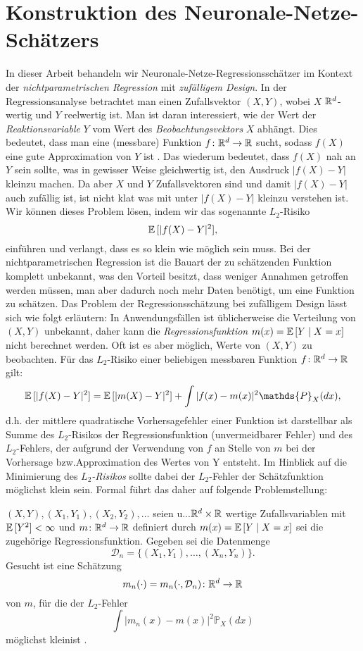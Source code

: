 \chapter{Konstruktion des Neuronale-Netze-Schätzers}
\label{chap:2}

In dieser Arbeit behandeln wir Neuronale-Netze-Regressionsschätzer im Kontext der \emph{nichtparametrischen Regression} mit \emph{zufälligem Design}. In der Regressionsanalyse betrachtet man einen Zufallsvektor $(X,Y)$, wobei $X$ $\mathbb{R}^d$-wertig und $Y$ reelwertig ist. Man ist daran interessiert, wie der Wert der \emph{Reaktionsvariable} $Y$ vom Wert des \emph{Beobachtungsvektors} $X$ abhängt. Dies bedeutet, dass man eine (messbare) Funktion $f\colon \mathbb{R}^d \to \mathbb{R}$ sucht, sodass $f(X)$ eine \glqq gute Approximation von $Y$ ist \grqq. Das wiederum bedeutet, dass $f(X)$ nah an $Y$ sein sollte, was in gewisser Weise gleichwertig ist, den Ausdruck $|f(X) - Y|$ \glqq klein\grqq zu machen. Da aber $X$ und $Y$ Zufallsvektoren sind und damit $|f(X) - Y|$ auch zufällig ist, ist nicht klat was mit unter \glqq $|f(X) - Y|$ klein\grqq zu verstehen ist. Wir können dieses Problem lösen, indem wir das sogenannte $L_2$-Risiko 
$$
\mathbb{E}\,[|f(X) - Y|^2],
$$
einführen und verlangt, dass es so klein wie möglich sein muss.
Bei der nichtparametrischen Regression ist die Bauart der zu schätzenden Funktion komplett unbekannt, was den Vorteil besitzt, dass weniger Annahmen getroffen werden müssen, man aber dadurch noch mehr Daten benötigt, um eine Funktion zu schätzen.
Das Problem der Regressionsschätzung bei zufälligem Design lässt sich wie folgt erläutern: 
In Anwendungsfällen ist üblicherweise die Verteilung von $(X, Y)$ unbekannt, daher kann die \emph{Regressionsfunktion} $m(x) = \mathbb{E}\,[Y \mid X = x]$ nicht berechnet werden. Oft ist es aber möglich, Werte von $(X, Y)$ zu beobachten.
Für das $L_2$-Risiko einer beliebigen messbaren Funktion $f\colon \mathbb{R}^d \to \mathbb{R}$  gilt:
$$\E[|f(X) - Y|^2] = \E[|m(X) - Y|^2] + \int|f(x) - m(x)|^2 \mathds{P}_X (dx),$$
d.h. der mittlere quadratische Vorhersagefehler einer Funktion ist darstellbar als Summe des $L_2$-Risikos der Regressionsfunktion (unvermeidbarer Fehler) und des $L_2$-Fehlers, der aufgrund der Verwendung von $f$ an Stelle von $m$ bei der Vorhersage bzw.\@ Approximation des Wertes von Y entsteht.
Im Hinblick auf die Minimierung des \emph{$L_2$-Risikos} sollte dabei der $L_2$-Fehler der Schätzfunktion möglichst klein sein.
Formal führt das daher auf folgende Problemstellung:
\begin{prblm}
$(X, Y), (X_1, Y_1), (X_2, Y_2), \dots$ seien u.\@i.\@v.\@ $\mathbb{R}^d \times \mathbb{R}$ wertige Zufallsvariablen mit $\mathbb{E}\,[Y^2] < \infty$ und $m\colon\mathbb{R}^d \to \mathbb{R}$ definiert durch $m(x) = \mathbb{E}\,[Y \mid X = x]$ sei die zugehörige Regressionsfunktion. Gegeben sei die Datenmenge 
\begin{equation}
\label{dataset}
\mathcal{D}_n = \{(X_1, Y_1),\dots,(X_n, Y_n)\}.
\end{equation}
Gesucht ist eine Schätzung 
$$m_n(\cdot) = m_n(\cdot, \mathcal{D}_n)\colon\mathbb{R}^d \to \mathbb{R} $$
von $m$, für die der $L_2$-Fehler 
$$\int |m_n(x) - m(x)|^2 \mathds{P}_X(dx)$$
möglichst \glqq klein\grqq\@ ist \cite[Kapitel 1.1 und Kapitel 1.2]{gyoerfi2002}. 
\end{prblm}
